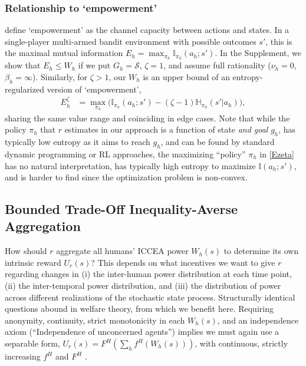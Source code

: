 \documentclass[letterpaper]{article} %
\def\S{\mathcal{S}}
\def\entropy{\mathbb{H}} %
\def\MI{\mathbb{I}} %
\begin{document}
\subsubsection{Relationship to `empowerment'}

\citet{klyubin2005empowerment} define `empowerment' as the channel capacity between actions and states. 
In a single-player multi-armed bandit environment with possible outcomes $s'$, this is the maximal mutual information
$E_h = \textstyle\max_{\pi_h} \MI_{\pi_h}(a_h;s')$.
In the Supplement, we show that $E_h\le W_h$ if we put $G_h=\S$, $\zeta=1$, and assume full rationality ($\nu_h=0$, $\beta_h=\infty$). 
Similarly, for $\zeta>1$, our $W_h$ is an upper bound of an entropy-regularized version of `empowerment',
\begin{align}
    E^\zeta_h &= \textstyle\max_{\pi_h} \big(\MI_{\pi_h}(a_h;s') - (\zeta-1)\entropy_{\pi_h}(s'|a_h)\big),\label{Ezeta}
\end{align}
sharing the same value range and coinciding in edge cases.
Note that while the policy $\pi_h$ that $r$ estimates in our approach is a function of state {\em and goal} $g_h$, has typically low entropy as it aims to reach $g_h$, and can be found by standard dynamic programming or RL approaches, 
the maximizing ``policy'' $\pi_h$ in \eqref{Ezeta} has no natural interpretation, has typically high entropy to maximize $\MI(a_h;s')$, and is harder to find since the optimization problem is non-convex.


\subsection{Bounded Trade-Off Inequality-Averse Aggregation}

How should $r$ aggregate all humans' ICCEA power $W_h(s)$ to determine its own intrinsic reward $U_r(s)$?
This depends on what incentives we want to give $r$ regarding changes in 
(i) the inter-human power distribution at each time point,
(ii) the inter-temporal power distribution, and
(iii) the distribution of power across different realizations of the stochastic state process. 
Structurally identical questions abound in welfare theory, from which we benefit here. 
Requiring anonymity, continuity, strict monotonicity in each $W_h(s)$, and an independence axiom (``Independence of unconcerned agents'') 
implies we must again use a separable form, $U_r(s) = F^H(\sum_h f^H(W_h(s)))$, with continuous, strictly increasing $f^H$ and $F^H$ \cite{fleming1952cardinal}.
\end{document}
